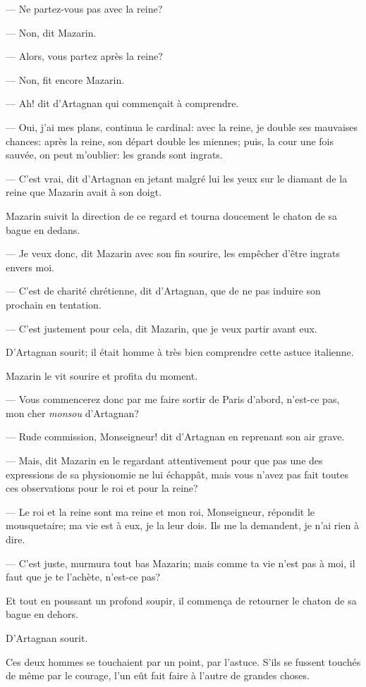 — Ne partez-vous pas avec la reine?

— Non, dit Mazarin.

— Alors, vous partez après la reine?

— Non, fit encore Mazarin.

— Ah! dit d'Artagnan qui commençait à comprendre.

— Oui, j'ai mes plans, continua le cardinal: avec la reine, je double ses mauvaises chances: après la reine, son départ double les miennes; puis, la cour une fois sauvée, on peut m'oublier: les grands sont ingrats.

— C'est vrai, dit d'Artagnan en jetant malgré lui les yeux sur le diamant de la reine que Mazarin avait à son doigt.

Mazarin suivit la direction de ce regard et tourna doucement le chaton de sa bague en dedans.

— Je veux donc, dit Mazarin avec son fin sourire, les empêcher d'être ingrats envers moi.

— C'est de charité chrétienne, dit d'Artagnan, que de ne pas induire son prochain en tentation.

— C'est justement pour cela, dit Mazarin, que je veux partir avant eux.

D'Artagnan sourit; il était homme à très bien comprendre cette astuce italienne.

Mazarin le vit sourire et profita du moment.

— Vous commencerez donc par me faire sortir de Paris d'abord, n'est-ce pas, mon cher \textit{monsou} d'Artagnan?

— Rude commission, Monseigneur! dit d'Artagnan en reprenant son air grave.

— Mais, dit Mazarin en le regardant attentivement pour que pas une des expressions de sa physionomie ne lui échappât, mais vous n'avez pas fait toutes ces observations pour le roi et pour la reine?

— Le roi et la reine sont ma reine et mon roi, Monseigneur, répondit le mousquetaire; ma vie est à eux, je la leur dois. Ils me la demandent, je n'ai rien à dire.

— C'est juste, murmura tout bas Mazarin; mais comme ta vie n'est pas à moi, il faut que je te l'achète, n'est-ce pas?

Et tout en poussant un profond soupir, il commença de retourner le chaton de sa bague en dehors.

D'Artagnan sourit.

Ces deux hommes se touchaient par un point, par l'astuce. S'ils se fussent touchés de même par le courage, l'un eût fait faire à l'autre de grandes choses.


